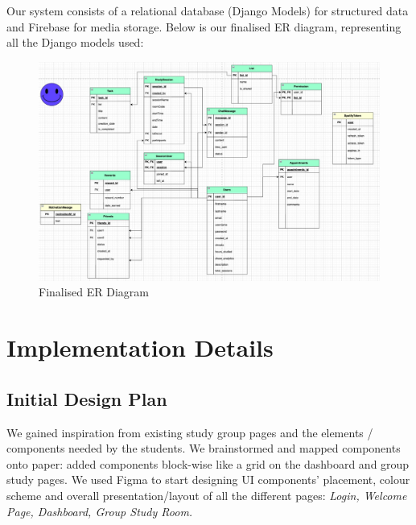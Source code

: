 Our system consists of a relational database (Django Models) for structured data and Firebase for media storage. Below is our finalised ER diagram, representing all the Django models used:

\begin{figure}
    \centering
    \includegraphics[width=1\linewidth]{ER-diagram}
    \caption{Finalised ER Diagram}
    \label{fig:er-diagram}
\end{figure}


\section{Implementation Details}
\label{sect:implementation-details}
\subsection{Initial Design Plan}
We gained inspiration from existing study group pages and the elements / components needed by the students. We brainstormed and mapped components onto paper: added components block-wise like a grid on the dashboard and group study pages. We used Figma to start designing UI components' placement, colour scheme and overall presentation/layout of all the different pages: \textit{Login, Welcome Page, Dashboard, Group Study Room.}

